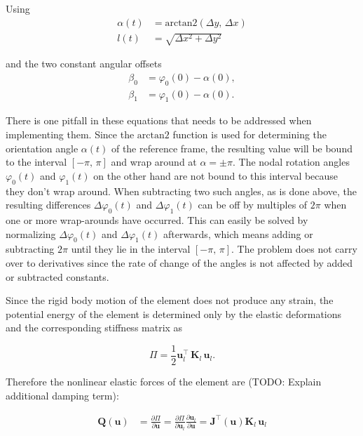 Using
%
\begin{align}
\alpha(t) &= \mathrm{arctan2}\left(\Delta y,\,\Delta x\right) \\
l(t) &= \sqrt{\Delta x^2 + \Delta y^2}
\end{align}

and the two constant angular offsets
%
\begin{align}
\beta_0 &= \varphi_0(0) - \alpha(0), \\
\beta_1 &= \varphi_1(0) - \alpha(0).
\end{align}

There is one pitfall in these equations that needs to be addressed when implementing them.
Since the $\mathrm{arctan2}$ function is used for determining the orientation angle $\alpha(t)$ of the reference frame, the resulting value will be bound to the interval $[-\pi,\,\pi]$ and wrap around at $\alpha = \pm\pi$.
The nodal rotation angles $\varphi_0(t)$ and $\varphi_1(t)$ on the other hand are not bound to this interval because they don't wrap around.
When subtracting two such angles, as is done above, the resulting differences $\Delta \varphi_0(t)$ and $\Delta \varphi_1(t)$ can be off by multiples of $2\pi$ when one or more wrap-arounds have occurred.
This can easily be solved by normalizing $\Delta \varphi_0(t)$ and $\Delta \varphi_1(t)$ afterwards, which means adding or subtracting $2\pi$ until they lie in the interval $[-\pi,\,\pi]$.
The problem does not carry over to derivatives since the rate of change of the angles is not affected by added or subtracted constants.

Since the rigid body motion of the element does not produce any strain, the potential energy of the element is determined only by the elastic deformations and the corresponding stiffness matrix as

\begin{equation}
\Pi = \frac{1}{2}\boldsymbol{u}_{l}^\intercal\,\boldsymbol{K}_{l}\,\boldsymbol{u}_{l}.
\end{equation}

Therefore the nonlinear elastic forces of the element are (TODO: Explain additional damping term):

\begin{align}
\boldsymbol{Q}(\boldsymbol{u}) &= \frac{\partial\Pi}{\partial\boldsymbol{u}} = \frac{\partial\Pi}{\partial\boldsymbol{u}_l}\frac{\partial\boldsymbol{u}_l}{\partial\boldsymbol{u}} = \boldsymbol{J}^\intercal(\boldsymbol{u})\boldsymbol{K}_{l}\,\boldsymbol{u}_{l}
\end{align}

